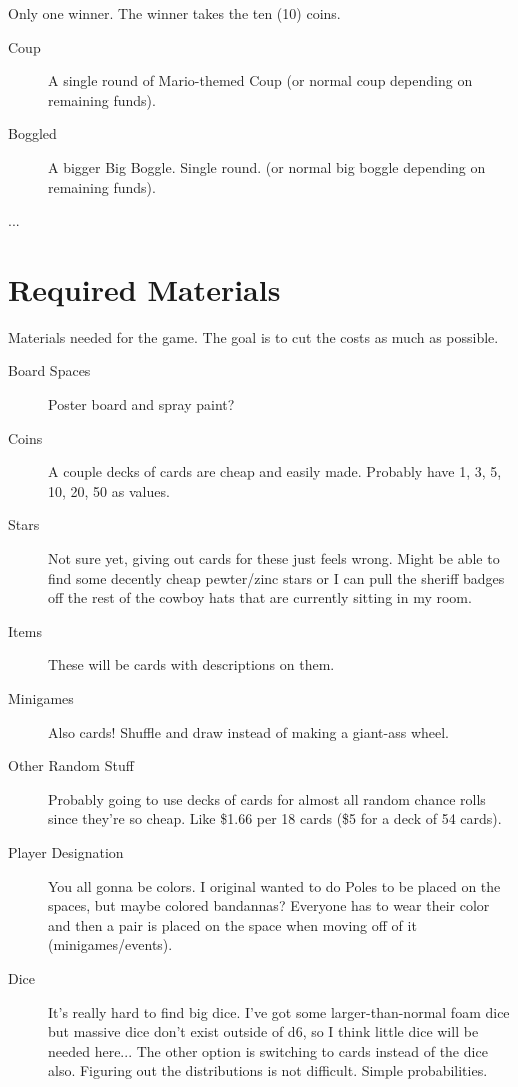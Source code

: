 \documentclass{article}
\begin{document}
Only one winner.  The winner takes the ten (10) coins.

\begin{description}
\item[Coup] A single round of Mario-themed Coup (or normal coup depending on remaining funds).
\item[Boggled] A bigger Big Boggle.  Single round. (or normal big boggle depending on remaining funds).
\item[...]
\end{description}

\section{Required Materials}

Materials needed for the game.  The goal is to cut the costs as much as possible.

\begin{description}
\item[Board Spaces] Poster board and spray paint?

\item[Coins] A couple decks of cards are cheap and easily made.
Probably have 1, 3, 5, 10, 20, 50 as values.

\item[Stars] Not sure yet, giving out cards for these just feels wrong. Might be able to find
some decently cheap pewter/zinc stars or I can pull the sheriff badges off the rest of the
cowboy hats that are currently sitting in my room.

\item[Items] These will be cards with descriptions on them.

\item[Minigames] Also cards! Shuffle and draw instead of making a giant-ass wheel.

\item[Other Random Stuff] Probably going to use decks of cards for almost all random
chance rolls since they're so cheap.  Like \$1.66 per 18 cards (\$5 for a deck of 54 cards).

\item[Player Designation] You all gonna be colors.  I original wanted to do Poles to be placed on the spaces,
but maybe colored bandannas?  Everyone has to wear their color and then a pair is placed on the space when
moving off of it (minigames/events).

\item[Dice] It's really hard to find big dice.  I've got some larger-than-normal foam dice but massive
dice don't exist outside of d6, so I think little dice will be needed here... The other option is switching
to cards instead of the dice also.  Figuring out the distributions is not difficult.  Simple probabilities.
\end{description}
\end{document}
